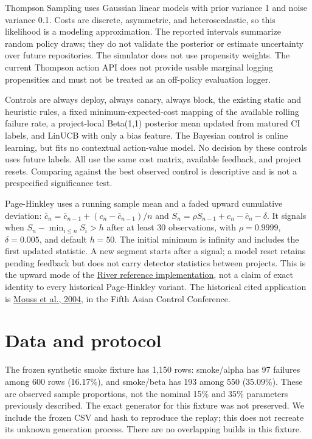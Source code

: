 \documentclass[
  10pt,
]{article}
\begin{document}
Thompson Sampling uses Gaussian linear models with prior variance 1 and
noise variance 0.1. Costs are discrete, asymmetric, and heteroscedastic,
so this likelihood is a modeling approximation. The reported intervals
summarize random policy draws; they do not validate the posterior or
estimate uncertainty over future repositories. The simulator does not
use propensity weights. The current Thompson action API does not provide
usable marginal logging propensities and must not be treated as an
off-policy evaluation logger.

Controls are always deploy, always canary, always block, the existing
static and heuristic rules, a fixed minimum-expected-cost mapping of the
available rolling failure rate, a project-local Beta(1,1) posterior mean
updated from matured CI labels, and LinUCB with only a bias feature. The
Bayesian control is online learning, but fits no contextual action-value
model. No decision by these controls uses future labels. All use the
same cost matrix, available feedback, and project resets. Comparing
against the best observed control is descriptive and is not a
prespecified significance test.

Page-Hinkley uses a running sample mean and a faded upward cumulative
deviation: \(\bar c_n=\bar c_{n-1}+(c_n-\bar c_{n-1})/n\) and
\(S_n=\rho S_{n-1}+c_n-\bar c_n-\delta\). It signals when
\(S_n-\min_{i\leq n}S_i>h\) after at least 30 observations, with
\(\rho=0.9999\), \(\delta=0.005\), and default \(h=50\). The initial
minimum is infinity and includes the first updated statistic. A new
segment starts after a signal; a model reset retains pending feedback
but does not carry detector statistics between projects. This is the
upward mode of the
\href{https://raw.githubusercontent.com/online-ml/river/main/river/drift/page_hinkley.py}{River
reference implementation}, not a claim of exact identity to every
historical Page-Hinkley variant. The historical cited application is
\href{https://doi.org/10.1109/ASCC.2004.184970}{Mouss et al., 2004}, in
the Fifth Asian Control Conference.

\section{Data and protocol}\label{data-and-protocol}

The frozen synthetic smoke fixture has 1,150 rows: smoke/alpha has 97
failures among 600 rows (16.17\%), and smoke/beta has 193 among 550
(35.09\%). These are observed sample proportions, not the nominal 15\%
and 35\% parameters previously described. The exact generator for this
fixture was not preserved. We include the frozen CSV and hash to
reproduce the replay; this does not recreate its unknown generation
process. There are no overlapping builds in this fixture.
\end{document}
